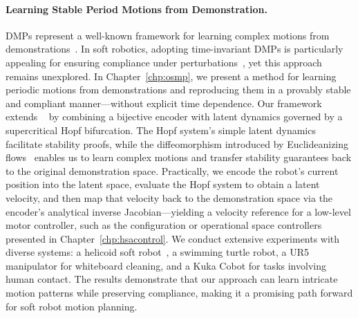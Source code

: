\paragraph{Learning Stable Period Motions from Demonstration.}
\glspl{DMP} represent a well-known framework for learning complex motions from demonstrations~\citep{ijspeert2013dynamical, saveriano2023dynamic}. In soft robotics, adopting time-invariant \glspl{DMP} is particularly appealing for ensuring compliance under perturbations~\citep{ijspeert2013dynamical}, yet this approach remains unexplored. In Chapter~\ref{chp:osmp}, we present a method for learning periodic motions from demonstrations and reproducing them in a provably stable and compliant manner—without explicit time dependence.
% 
Our framework extends ~\citep{ijspeert2013dynamical, rana2020euclideanizing, perez2023stable} by combining a bijective encoder with latent dynamics governed by a supercritical Hopf bifurcation. The Hopf system’s simple latent dynamics facilitate stability proofs, while the diffeomorphism introduced by Euclideanizing flows~\citep{dinh2016density, rana2020euclideanizing} enables us to learn complex motions and transfer stability guarantees back to the original demonstration space. Practically, we encode the robot’s current position into the latent space, evaluate the Hopf system to obtain a latent velocity, and then map that velocity back to the demonstration space via the encoder’s analytical inverse Jacobian—yielding a velocity reference for a low-level motor controller, such as the configuration or operational space controllers presented in Chapter~\ref{chp:hsacontrol}.
% 
We conduct extensive experiments with diverse systems: a helicoid soft robot~\citep{guan2023trimmed}, a swimming turtle robot, a UR5 manipulator for whiteboard cleaning, and a Kuka \gls{Cobot} for tasks involving human contact. The results demonstrate that our approach can learn intricate motion patterns while preserving compliance, making it a promising path forward for soft robot motion planning.